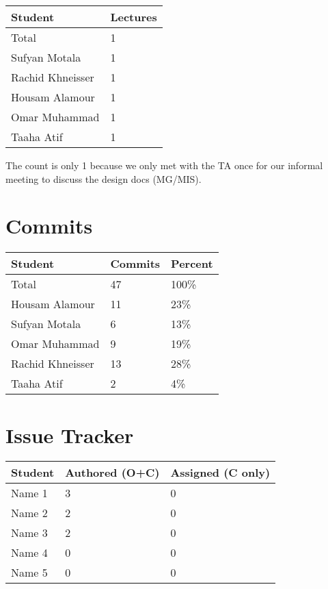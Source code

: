 \documentclass{article}
\begin{document}
\begin{table}[H]
\centering
\begin{tabular}{ll}
\toprule
\textbf{Student} & \textbf{Lectures}\\
\midrule
Total & 1\\
Sufyan Motala & 1\\
Rachid Khneisser & 1\\
Housam Alamour & 1\\
Omar Muhammad & 1\\
Taaha Atif & 1\\
\bottomrule
\end{tabular}
\end{table}

The count is only 1 because we only met with the TA once for our informal meeting to discuss the design docs (MG/MIS).

\section{Commits}

\begin{table}[H]
\centering
\begin{tabular}{lll}
\toprule
\textbf{Student} & \textbf{Commits} & \textbf{Percent}\\
\midrule
Total & 47 & 100\% \\
Housam Alamour & 11 & 23\% \\
Sufyan Motala & 6 & 13\% \\
Omar Muhammad & 9 & 19\% \\
Rachid Khneisser & 13 & 28\% \\
Taaha Atif & 2 & 4\% \\
\bottomrule
\end{tabular}
\end{table}

\section{Issue Tracker}

\begin{table}[H]
\centering
\begin{tabular}{lll}
\toprule
\textbf{Student} & \textbf{Authored (O+C)} & \textbf{Assigned (C only)}\\
\midrule
Name 1 & 3 & 0 \\
Name 2 & 2 & 0 \\
Name 3 & 2 & 0 \\
Name 4 & 0 & 0 \\
Name 5 & 0 & 0 \\
\bottomrule
\end{tabular}
\end{table}
\end{document}
